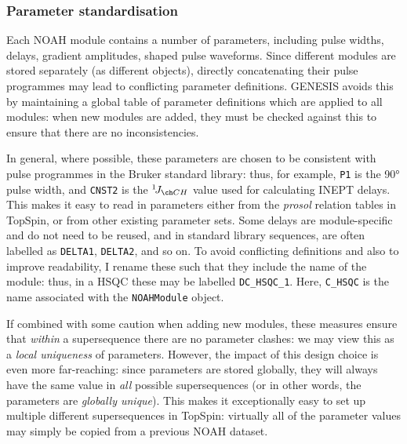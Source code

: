 \subsubsection{Parameter standardisation}

Each NOAH module contains a number of parameters, including pulse widths, delays, gradient amplitudes, shaped pulse waveforms.
Since different modules are stored separately (as different objects), directly concatenating their pulse programmes may lead to conflicting parameter definitions.
GENESIS avoids this by maintaining a global table of parameter definitions which are applied to all modules: when new modules are added, they must be checked against this to ensure that there are no inconsistencies.

In general, where possible, these parameters are chosen to be consistent with pulse programmes in the Bruker standard library: thus, for example, \texttt{P1} is the \proton{} \ang{90} pulse width, and \texttt{CNST2} is the $\oneJ{CH}$ value used for calculating INEPT delays.
This makes it easy to read in parameters either from the \textit{prosol} relation tables in TopSpin, or from other existing parameter sets.
Some delays are module-specific and do not need to be reused, and in standard library sequences, are often labelled as \texttt{DELTA1}, \texttt{DELTA2}, and so on.
To avoid conflicting definitions and also to improve readability, I rename these such that they include the name of the module: thus, in a \carbon{} HSQC these may be labelled \texttt{DC\_HSQC\_1}.
Here, \texttt{C\_HSQC} is the name associated with the \texttt{NOAHModule} object.

If combined with some caution when adding new modules, these measures ensure that \textit{within} a supersequence there are no parameter clashes: we may view this as a \textit{local uniqueness} of parameters.
However, the impact of this design choice is even more far-reaching:
since parameters are stored globally, they will always have the same value in \textit{all} possible supersequences (or in other words, the parameters are \textit{globally unique}).
This makes it exceptionally easy to set up multiple different supersequences in TopSpin: virtually all of the parameter values may simply be copied from a previous NOAH dataset.

